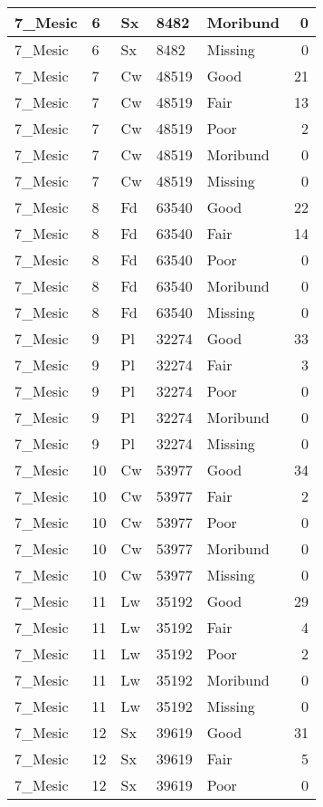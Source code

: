 \documentclass[
]{article}
\begin{document}
\begin{tabular}{l|l|l|l|l|r}
\hline
7\_Mesic & 6 & Sx & 8482 & Moribund & 0\\
\hline
7\_Mesic & 6 & Sx & 8482 & Missing & 0\\
\hline
7\_Mesic & 7 & Cw & 48519 & Good & 21\\
\hline
7\_Mesic & 7 & Cw & 48519 & Fair & 13\\
\hline
7\_Mesic & 7 & Cw & 48519 & Poor & 2\\
\hline
7\_Mesic & 7 & Cw & 48519 & Moribund & 0\\
\hline
7\_Mesic & 7 & Cw & 48519 & Missing & 0\\
\hline
7\_Mesic & 8 & Fd & 63540 & Good & 22\\
\hline
7\_Mesic & 8 & Fd & 63540 & Fair & 14\\
\hline
7\_Mesic & 8 & Fd & 63540 & Poor & 0\\
\hline
7\_Mesic & 8 & Fd & 63540 & Moribund & 0\\
\hline
7\_Mesic & 8 & Fd & 63540 & Missing & 0\\
\hline
7\_Mesic & 9 & Pl & 32274 & Good & 33\\
\hline
7\_Mesic & 9 & Pl & 32274 & Fair & 3\\
\hline
7\_Mesic & 9 & Pl & 32274 & Poor & 0\\
\hline
7\_Mesic & 9 & Pl & 32274 & Moribund & 0\\
\hline
7\_Mesic & 9 & Pl & 32274 & Missing & 0\\
\hline
7\_Mesic & 10 & Cw & 53977 & Good & 34\\
\hline
7\_Mesic & 10 & Cw & 53977 & Fair & 2\\
\hline
7\_Mesic & 10 & Cw & 53977 & Poor & 0\\
\hline
7\_Mesic & 10 & Cw & 53977 & Moribund & 0\\
\hline
7\_Mesic & 10 & Cw & 53977 & Missing & 0\\
\hline
7\_Mesic & 11 & Lw & 35192 & Good & 29\\
\hline
7\_Mesic & 11 & Lw & 35192 & Fair & 4\\
\hline
7\_Mesic & 11 & Lw & 35192 & Poor & 2\\
\hline
7\_Mesic & 11 & Lw & 35192 & Moribund & 0\\
\hline
7\_Mesic & 11 & Lw & 35192 & Missing & 0\\
\hline
7\_Mesic & 12 & Sx & 39619 & Good & 31\\
\hline
7\_Mesic & 12 & Sx & 39619 & Fair & 5\\
\hline
7\_Mesic & 12 & Sx & 39619 & Poor & 0\\

\end{tabular}
\end{document}
